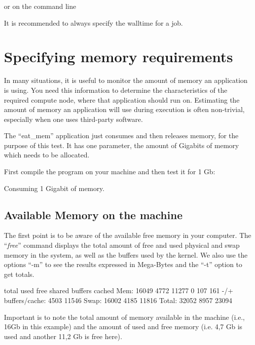 or on the command line
\begin{prompt}
\end{prompt}

It is recommended to always specify the walltime for a job.

\section{Specifying memory requirements}

In many situations, it is useful to monitor the amount of memory an application
is using. You need this information to determine the characteristics of the
required compute node, where that application should run on.  Estimating the
amount of memory an application will use during execution is often non-trivial,
especially when one uses third-party software.

The ``eat\_mem'' application just consumes and then releases memory, for the
purpose of this test. It has one parameter, the amount of Gigabits of memory
which needs to be allocated.

First compile the program on your machine and then test it for 1 Gb:
\begin{prompt}
Consuming 1 Gigabit of memory.
\end{prompt}


\subsection{Available Memory on the machine}

The first point is to be aware of the available free memory in your computer.
The ``\emph{free}'' command displays the total amount of free and used
physical and swap memory in the system, as well as the buffers used by the
kernel. We also use the options ``-m'' to see the results expressed in
Mega-Bytes and the ``-t'' option to get totals.

\begin{prompt}
                total   used   free  shared  buffers  cached
Mem:            16049   4772  11277       0      107     161
-/+ buffers/cache:      4503  11546
Swap:           16002   4185  11816
Total:          32052   8957  23094
\end{prompt}

Important is to note the total amount of memory available in the machine (i.e.,
16Gb in this example) and the amount of used and free memory (i.e. 4,7 Gb is
used and another 11,2 Gb is free here).

